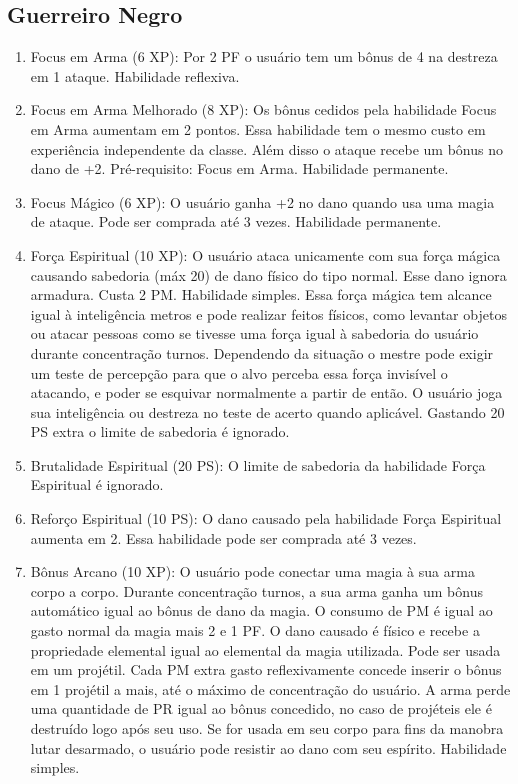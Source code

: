  
  \subsection{Guerreiro Negro}
  
  
\begin{enumerate}

	\item Focus em Arma (6 XP): Por 2 PF o usuário tem um bônus de 4 na destreza em 1 ataque. Habilidade reflexiva.

	\item Focus em Arma Melhorado (8 XP): Os bônus cedidos pela habilidade Focus em Arma aumentam em 2 pontos. Essa habilidade tem o mesmo custo em experiência independente da classe. Além disso o ataque recebe um bônus no dano de +2. Pré-requisito: Focus em Arma. Habilidade permanente.

	\item Focus Mágico (6 XP): O usuário ganha +2 no dano quando usa uma magia de ataque. Pode ser comprada até 3 vezes. Habilidade permanente.	
 	
 	\item Força Espiritual (10 XP): O usuário ataca unicamente com sua força mágica causando sabedoria (máx 20) de dano físico do tipo normal. Esse dano ignora armadura. Custa 2 PM. Habilidade simples. Essa força mágica tem alcance igual à inteligência metros e pode realizar feitos físicos, como levantar objetos ou atacar pessoas como se tivesse uma força igual à sabedoria do usuário durante concentração turnos. Dependendo da situação o mestre pode exigir um teste de percepção para que o alvo perceba essa força invisível o atacando, e poder se esquivar normalmente a partir de então. O usuário joga sua inteligência ou destreza no teste de acerto quando aplicável. Gastando 20 PS extra o limite de sabedoria é ignorado.  
 	
 	\item Brutalidade Espiritual (20 PS): O limite de sabedoria da habilidade Força Espiritual é ignorado.
 	
 	\item Reforço Espiritual (10 PS): O dano causado pela habilidade Força Espiritual aumenta em 2. Essa habilidade pode ser comprada até 3 vezes.

	\item Bônus Arcano (10 XP): O usuário pode conectar uma magia à sua arma corpo a corpo. Durante concentração turnos, a sua arma ganha um bônus automático igual ao bônus de dano da magia. O consumo de PM é igual ao gasto normal da magia mais 2 e 1 PF. O dano causado é físico e recebe a propriedade elemental igual ao elemental da magia utilizada. Pode ser usada em um projétil. Cada PM extra gasto reflexivamente concede inserir o bônus em 1 projétil a mais, até o máximo de concentração do usuário. A arma perde uma quantidade de PR igual ao bônus concedido, no caso de projéteis ele é destruído logo após seu uso. Se for usada em seu corpo para fins da manobra lutar desarmado, o usuário pode resistir ao dano com seu espírito. Habilidade simples.


\end{enumerate}
